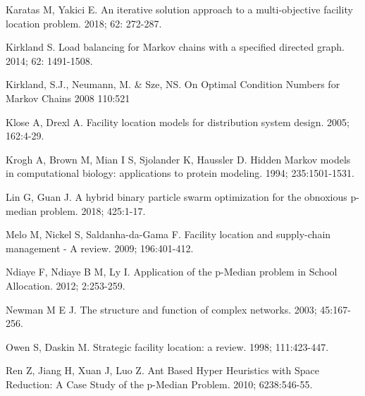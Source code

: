 \documentclass[twoside,twocolumn]{article}
\begin{document}
\begin{thebibliography}{99}
Karatas M, Yakici E.
\newblock An iterative solution approach to a multi-objective facility location problem.
 2018; 62: 272-287.

Kirkland S.
\newblock Load balancing for Markov chains with a specified directed graph.
 2014; 62: 1491-1508.

Kirkland, S.J., Neumann, M. \& Sze, NS.
\newblock On Optimal Condition Numbers for Markov Chains
 2008 110:521

Klose A, Drexl A.
\newblock Facility location models for distribution system design.
 2005; 162:4-29.

Krogh A, Brown M, Mian I S, Sjolander K, Haussler D.
\newblock Hidden Markov models in computational biology: applications to protein modeling.
 1994; 235:1501-1531.

Lin G, Guan J.
\newblock A hybrid binary particle swarm optimization for the obnoxious p-median problem.
 2018; 425:1-17.

Melo M, Nickel S, Saldanha-da-Gama F.
\newblock Facility location and supply-chain management - A review.
  2009; 196:401-412.

Ndiaye F, Ndiaye B M, Ly I.
\newblock Application of the p-Median problem in School Allocation.
 2012; 2:253-259.

Newman M E J.
\newblock The structure and function of complex networks.
 2003; 45:167-256.

Owen S, Daskin M.
\newblock Strategic facility location: a review.
 1998; 111:423-447.

Ren Z, Jiang H, Xuan J, Luo Z.
\newblock Ant Based Hyper Heuristics with Space Reduction: A Case Study of the p-Median Problem.
 2010; 6238:546-55.


\end{thebibliography}
\end{document}
